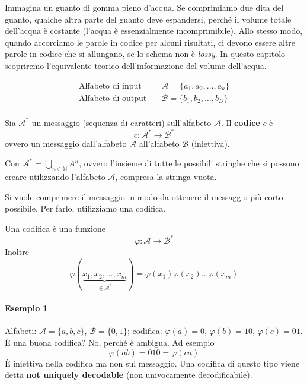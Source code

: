 Immagina un guanto di gomma pieno d'acqua. Se comprimiamo due dita del guanto, qualche altra parte del guanto deve espandersi, perché il volume totale dell'acqua è costante (l'acqua è essenzialmente incomprimibile). Allo stesso modo, quando accorciamo le parole in codice per alcuni risultati, ci devono essere altre parole in codice che si allungano, se lo schema non è \emph{lossy}. In questo capitolo scopriremo l'equivalente teorico dell'informazione del volume dell'acqua.

\begin{definition}
    \begin{align*}
        \text{Alfabeto di input} \quad &\mathcal{A}=\{a_1,a_2,\dots,a_k\}\\
        \text{Alfabeto di output} \quad &\mathcal{B}=\{b_1,b_2,\dots,b_D\}\\
    \end{align*}
\end{definition}

\begin{definition}[Codice]
    Sia $\mathcal{A}^*$ un messaggio (sequenza di caratteri) sull'alfabeto $\mathcal{A}$. Il \textbf{codice} $c$ è
    $$
        c:\mathcal{A}^*\to\mathcal{B}^*
    $$
    ovvero un messaggio dall'alfabeto $\mathcal{A}$ all'alfabeto $\mathcal{B}$ (iniettiva).
\end{definition}
Con $\mathcal{A}^*=\bigcup_{n\in\mathbb{N}}A^n$, ovvero l'insieme di tutte le possibili stringhe che si possono creare utilizzando l'alfabeto $\mathcal{A}$, compresa la stringa vuota.\medskip 

Si vuole comprimere il messaggio in modo da ottenere il messaggio più corto possibile. Per farlo, utilizziamo una codifica.
\begin{definition}[Codifica]
    Una codifica è una funzione 
    $$
        \varphi:\mathcal{A}\to\mathcal{B}^*
    $$ 
    Inoltre
    $$
        \varphi(\underbrace{x_1,x_2,\dots,x_m}_{\in\mathcal{A}^*}) = \varphi(x_1)\varphi(x_2)\dots\varphi(x_m)
    $$
\end{definition}

\paragraph{Esempio 1} Alfabeti: $\mathcal{A}=\{a,b,c\}$, $\mathcal{B}=\{0,1\}$; codifica: $\varphi(a)=0$, $\varphi(b)=10$, $\varphi(c)=01$. È una buona codifica? No, perché è ambigua. Ad esempio
$$
    \varphi(ab) = 010 = \varphi(ca)
$$
È iniettiva nella codifica ma non sul messaggio. Una codifica di questo tipo viene detta \textbf{not uniquely decodable} (non univocamente decodificabile).

